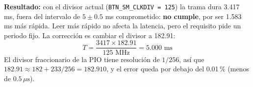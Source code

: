 \textbf{Resultado:} con el divisor actual (\texttt{BTN\_SM\_CLKDIV = 125}) la trama dura 3.417 ms, fuera del
intervalo de $5 \pm 0.5$ ms comprometido: \textbf{no cumple}, por ser 1.583 ms más rápida. Leer más rápido no afecta
la latencia, pero el requisito pide un periodo fijo. La corrección es cambiar el divisor a 182.91:
\[
T = \frac{3417 \times 182.91}{125\text{ MHz}} = 5.000\text{ ms}
\]
El divisor fraccionario de la PIO tiene resolución de $1/256$, así que $182.91 \approx 182 + 233/256 = 182.910$,
y el error queda por debajo del 0.01\,\% (menos de $0.5\,\mu\text{s}$).

